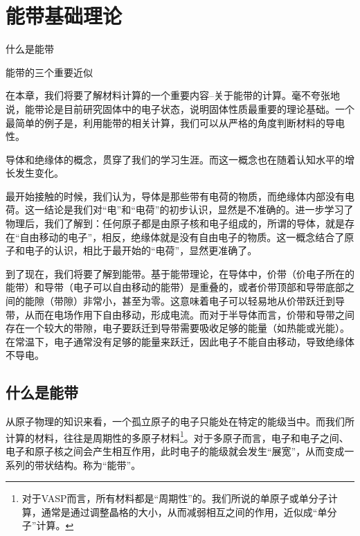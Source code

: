 \section{能带基础理论}\label{sec:能带基础理论}

\begin{Abstract}
    \item 什么是能带
    \item 能带的三个重要近似
\end{Abstract}

在本章，我们将要了解材料计算的一个重要内容--关于能带的计算。毫不夸张地说，能带论是目前研究固体中的电子状态，说明固体性质最重要的理论基础。一个最简单的例子是，利用能带的相关计算，我们可以从严格的角度判断材料的导电性。

\begin{extend}
    导体和绝缘体的概念，贯穿了我们的学习生涯。而这一概念也在随着认知水平的增长发生变化。

    最开始接触的时候，我们认为，导体是那些带有电荷的物质，而绝缘体内部没有电荷。这一结论是我们对“电”和“电荷”的初步认识，显然是不准确的。进一步学习了物理后，我们了解到：任何原子都是由原子核和电子组成的，所谓的导体，就是存在“自由移动的电子”，相反，绝缘体就是没有自由电子的物质。这一概念结合了原子和电子的认识，相比于最开始的“电荷”，显然更准确了。

    到了现在，我们将要了解到能带。基于能带理论，在导体中，价带（价电子所在的能带）和导带（电子可以自由移动的能带）是重叠的，或者价带顶部和导带底部之间的能隙（带隙）非常小，甚至为零。这意味着电子可以轻易地从价带跃迁到导带，从而在电场作用下自由移动，形成电流。而对于半导体而言，价带和导带之间存在一个较大的带隙，电子要跃迁到导带需要吸收足够的能量（如热能或光能）。在常温下，电子通常没有足够的能量来跃迁，因此电子不能自由移动，导致绝缘体不导电。
\end{extend}

\subsection{什么是能带}\label{subsec:能带理论基础-什么是能带}

从原子物理的知识来看，一个孤立原子的电子只能处在特定的能级当中。而我们所计算的材料，往往是周期性的多原子材料\footnote{对于VASP而言，所有材料都是“周期性”的。我们所说的单原子或单分子计算，通常是通过调整晶格的大小，从而减弱相互之间的作用，近似成“单分子”计算。}。对于多原子而言，电子和电子之间、电子和原子核之间会产生相互作用，此时电子的能级就会发生“展宽”，从而变成一系列的带状结构。称为“能带”。

